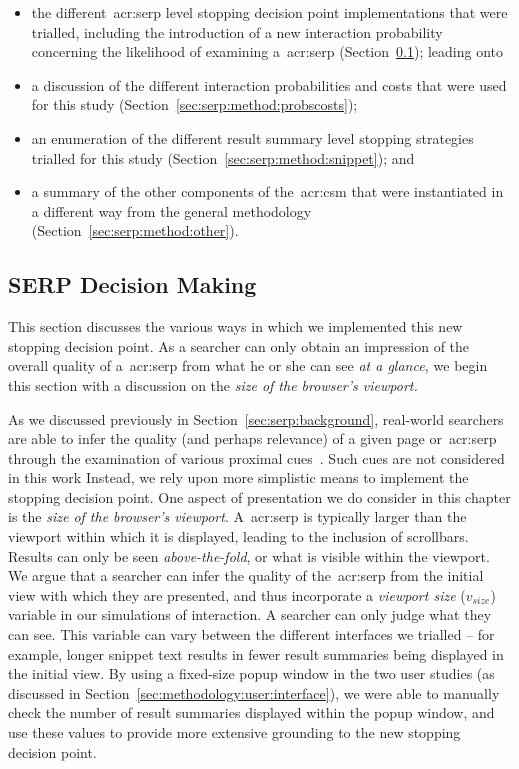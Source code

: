 \begin{itemize}
    \item{the different~\gls{acr:serp} level stopping decision point implementations that were trialled, including the introduction of a new interaction probability concerning the likelihood of examining a~\gls{acr:serp} (Section~\ref{sec:serp:method:serp_dp}); leading onto}
    \item{a discussion of the different interaction probabilities and costs that were used for this study (Section~\ref{sec:serp:method:probscosts});}
    \item{an enumeration of the different result summary level stopping strategies trialled for this study (Section~\ref{sec:serp:method:snippet}); and}
    \item{a summary of the other components of the~\gls{acr:csm} that were instantiated in a different way from the general methodology (Section~\ref{sec:serp:method:other}).}
\end{itemize}

\subsection{SERP Decision Making}\label{sec:serp:method:serp_dp}
This section discusses the various ways in which we implemented this new stopping decision point. As a searcher can only obtain an impression of the overall quality of a~\gls{acr:serp} from what he or she can see \emph{at a glance,} we begin this section with a discussion on the \emph{size of the browser's viewport.}

As we discussed previously in Section~\ref{sec:serp:background}, real-world searchers are able to infer the quality (and perhaps relevance) of a given page or~\gls{acr:serp} through the examination of various proximal cues~\citep{chi2001information_scent}. Such cues are not considered in this work Instead, we rely upon more simplistic means to implement the stopping decision point. One aspect of presentation we do consider in this chapter is the \emph{size of the browser's viewport}. A~\gls{acr:serp} is typically larger than the viewport within which it is displayed, leading to the inclusion of scrollbars. Results can only be seen \emph{above-the-fold}, or what is visible within the viewport. We argue that a searcher can infer the quality of the~\gls{acr:serp} from the initial view with which they are presented, and thus incorporate a \emph{viewport size} ($v_{size}$) variable in our simulations of interaction. A searcher can only judge what they can see. This variable can vary between the different interfaces we trialled -- for example, longer snippet text results in fewer result summaries being displayed in the initial view. By using a fixed-size popup window in the two user studies (as discussed in Section~\ref{sec:methodology:user:interface}), we were able to manually check the number of result summaries displayed within the popup window, and use these values to provide more extensive grounding to the new stopping decision point.

